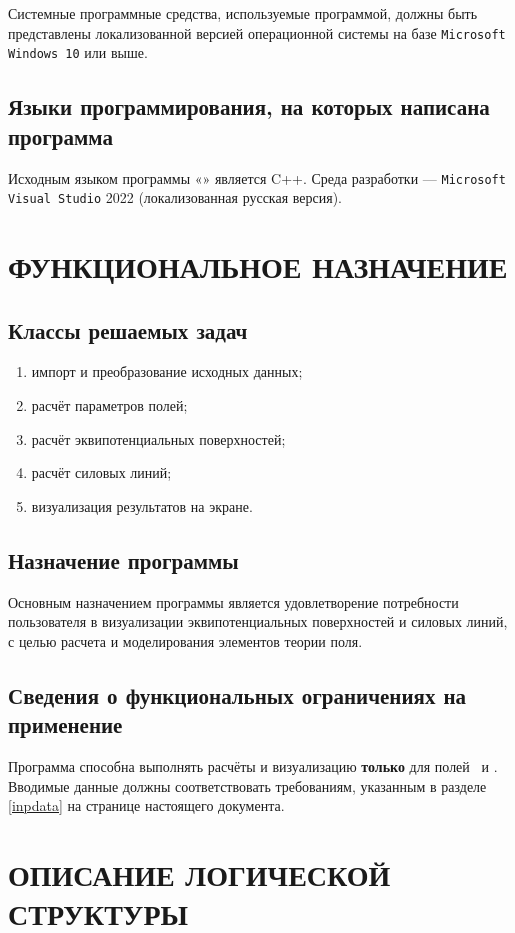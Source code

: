 \documentclass[14pt,a4paper,final]{extreport}
\begin{document}
Системные программные средства, используемые программой, должны быть представлены локализованной версией операционной системы на базе
\texttt{Microsoft Windows 10} или выше.

\section{Языки программирования, на которых написана программа}

Исходным языком программы «\programtitle» является C++. Среда разработки --- \texttt{Microsoft Visual Studio} 2022 (локализованная русская версия).

\chapter{ФУНКЦИОНАЛЬНОЕ НАЗНАЧЕНИЕ}
\section{Классы решаемых задач}

\begin{enumerate}
	\item импорт и преобразование исходных данных;
	\item расчёт параметров полей;
	\item расчёт эквипотенциальных поверхностей;
	\item расчёт силовых линий;
	\item визуализация результатов на экране.
\end{enumerate}


\section{Назначение программы}
Основным назначением программы является удовлетворение потребности пользователя в визуализации эквипотенциальных поверхностей и силовых линий, с целью расчета и моделирования элементов теории поля.

\section{Сведения о функциональных ограничениях на применение}
Программа способна выполнять расчёты и визуализацию \textbf{только} для полей
\fieldA\ и \fieldB. Вводимые данные должны соответствовать требованиям,
указанным в разделе \ref{inpdata} на странице \pageref{inpdata} настоящего документа.
\pagebreak

\chapter{ОПИСАНИЕ ЛОГИЧЕСКОЙ СТРУКТУРЫ}
\end{document}
